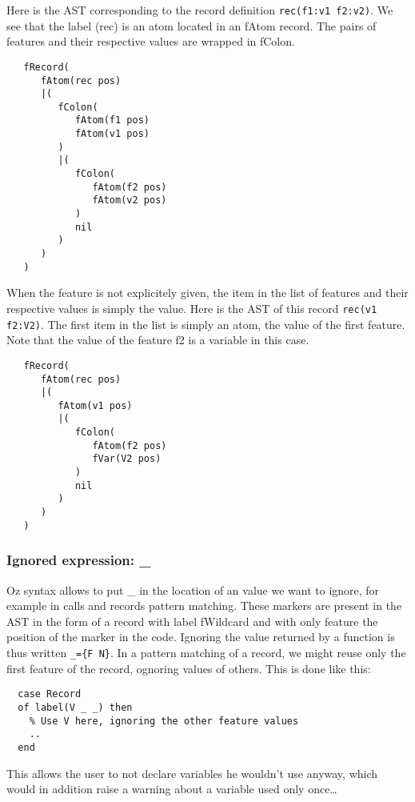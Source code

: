 \documentclass[a4paper]{memoir}
\begin{document}
Here is the AST corresponding to the record definition \lstinline!rec(f1:v1 f2:v2)!. We see that the label (rec) is an atom located in an fAtom record. The pairs of features and their respective values are wrapped in fColon.

\begin{lstlisting}
   fRecord(
      fAtom(rec pos)
      |(
         fColon(
            fAtom(f1 pos)
            fAtom(v1 pos)
         )
         |(
            fColon(
               fAtom(f2 pos)
               fAtom(v2 pos)
            )
            nil
         )
      )
   )
\end{lstlisting}

When the feature is not explicitely given, the item in the list of features and their respective values is simply the value. Here is the AST of this record \lstinline!rec(v1 f2:V2)!. The first item in the list is simply an atom, the value of the first feature. Note that the value of the feature f2 is a variable in this case.

\begin{lstlisting}
   fRecord(
      fAtom(rec pos)
      |(
         fAtom(v1 pos)
         |(
            fColon(
               fAtom(f2 pos)
               fVar(V2 pos)
            )
            nil
         )
      )
   )
\end{lstlisting}


\subsubsection{Ignored expression: \_}
Oz syntax allows to put \_ in the location of an value we want to ignore, for example in calls and records pattern matching. These markers are present in the AST in the form of a record with label fWildcard and with only feature the position of the marker in the code.
Ignoring the value returned by a function is thus written \lstinline!_={F N}!. In a pattern matching of a record, we might reuse only the first feature of the record, ognoring values of others. This is done like this:
\begin{lstlisting}
  case Record 
  of label(V _ _) then
    % Use V here, ignoring the other feature values
    ..
  end
\end{lstlisting}
This allows the user to not declare variables he wouldn't use anyway, which would in addition raise a warning about a variable used only once\ldots
\end{document}
